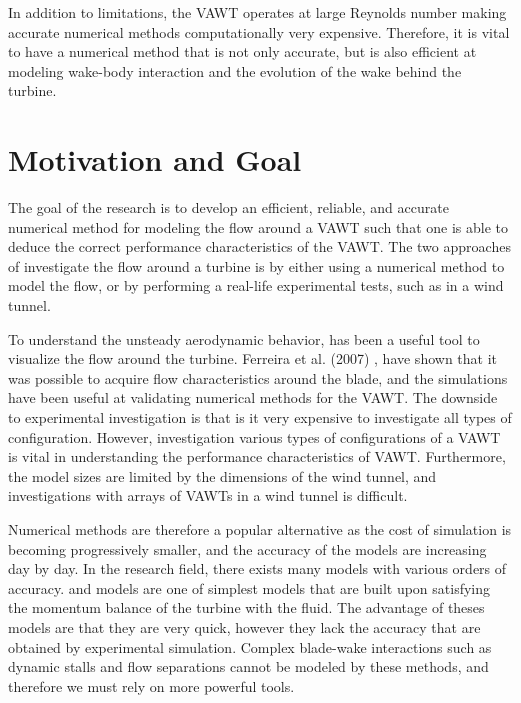 In addition to limitations, the VAWT operates at large Reynolds number making accurate numerical methods computationally very expensive. Therefore, it is vital to have a numerical method that is not only accurate, but is also efficient at modeling wake-body interaction and the evolution of the wake behind the turbine.

\section{Motivation and Goal}
The goal of the research is to develop an efficient, reliable, and accurate numerical method for modeling the flow around a  VAWT such that one is able to deduce the correct performance characteristics of the VAWT. The two approaches of investigate the flow around a turbine is by either using a numerical method to model the flow, or by performing a real-life experimental tests, such as in a wind tunnel.

To understand the unsteady aerodynamic behavior,  has been a useful tool to visualize the flow around the turbine. Ferreira et al. (2007) \cite{Ferreira2007}, have shown that it was possible to acquire flow characteristics around the blade, and the simulations have been useful at validating numerical methods for the VAWT. The downside to experimental investigation is that is it very expensive to investigate all types of configuration. However, investigation various types of configurations of a VAWT is vital in understanding the performance characteristics of VAWT. Furthermore, the model sizes are limited by the dimensions of the wind tunnel, and investigations with arrays of VAWTs in a wind tunnel is difficult.

Numerical methods are therefore a popular alternative as the cost of simulation is becoming progressively smaller, and the accuracy of the models are increasing day by day. In the research field, there exists many models with various orders of accuracy.  and  models are one of simplest models that are built upon satisfying the momentum balance of the turbine with the fluid. The advantage of theses models are that they are very quick, however they lack the accuracy that are obtained by experimental simulation. Complex blade-wake interactions such as dynamic stalls and flow separations cannot be modeled by these methods, and therefore we must rely on more powerful tools.

